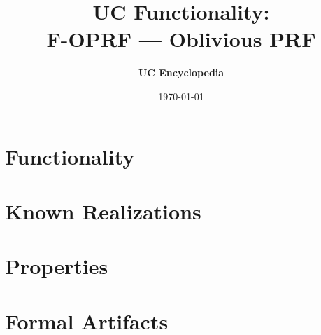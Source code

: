 \documentclass[11pt,a4paper]{article}
\title{\textbf{\Large UC Functionality:}\\[0.2em] \Large F-OPRF --- Oblivious PRF}
\author{\textbf{UC Encyclopedia}}
\date{\today}
\newtheorem{functionality}{Functionality}
\begin{document}
\maketitle

\begin{abstract}
\end{abstract}

\section{Functionality}

%

\section{Known Realizations}


\section{Properties}


\section{Formal Artifacts}

\end{document}
